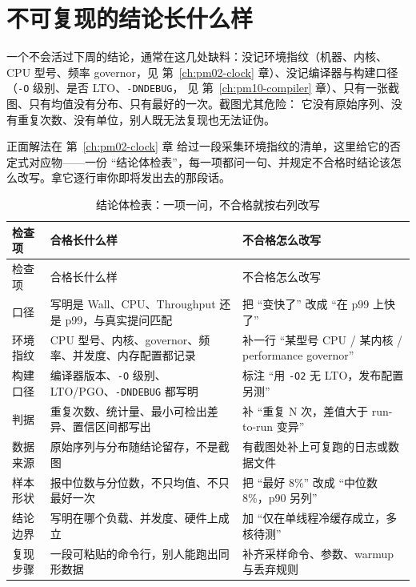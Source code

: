 \documentclass[12pt,a4paper,fontset=fandol]{ctexbook}
\newcommand{\Tp}[1]{\texttt{#1}}
\newcommand{\Lang}[1]{\textsf{#1}}
\newcommand{\MWall}{\Lang{Wall}}
\newcommand{\MCpu}{\Lang{CPU}}
\newcommand{\MThr}{\Lang{Throughput}}
\newcommand{\Mx}[1]{\textsf{#1}}
\begin{document}
\section{不可复现的结论长什么样}
\label{sec:pm15-antipattern-unrepro}

一个不会活过下周的结论，通常在这几处缺料：没记环境指纹（机器、内核、CPU 型号、频率 governor，见
第~\ref{ch:pm02-clock} 章）、没记编译器与构建口径（\Tp{-O} 级别、是否 LTO、\Tp{-DNDEBUG}，
见 第~\ref{ch:pm10-compiler} 章）、只有一张截图、只有均值没有分布、只有最好的一次。截图尤其危险：
它没有原始序列、没有重复次数、没有单位，别人既无法复现也无法证伪。

正面解法在 第~\ref{ch:pm02-clock} 章 给过一段采集环境指纹的清单，这里给它的否定式对应物——一份
``结论体检表''，每一项都问一句、并规定不合格时结论该怎么改写。拿它逐行审你即将发出去的那段话。

\begin{longtable}{@{}>{\raggedright\arraybackslash}p{}>{\raggedright\arraybackslash}p{}>{\raggedright\arraybackslash}p{}@{}}
\caption{结论体检表：一项一问，不合格就按右列改写}\label{tab:pm15-audit}\\
\toprule
检查项 & 合格长什么样 & 不合格怎么改写 \\
\midrule
\endfirsthead
\toprule
检查项 & 合格长什么样 & 不合格怎么改写 \\
\midrule
\endhead
\bottomrule
\endfoot
口径 & 写明是 \MWall{}、\MCpu{}、\MThr{} 还是 \Mx{p99}，与真实提问匹配 & 把 ``变快了'' 改成 ``在 \Mx{p99} 上快了'' \\
环境指纹 & CPU 型号、内核、governor、频率、并发度、内存配置都记录 & 补一行 ``某型号 CPU / 某内核 / performance governor'' \\
构建口径 & 编译器版本、\Tp{-O} 级别、LTO/PGO、\Tp{-DNDEBUG} 都写明 & 标注 ``用 \Tp{-O2} 无 LTO，发布配置另测'' \\
判据 & 重复次数、统计量、最小可检出差异、置信区间都写出 & 补 ``重复 N 次，差值大于 run-to-run 变异'' \\
数据来源 & 原始序列与分布随结论留存，不是截图 & 有截图处补上可复跑的日志或数据文件 \\
样本形状 & 报中位数与分位数，不只均值、不只最好一次 & 把 ``最好 8\%'' 改成 ``中位数 8\%，p90 另列'' \\
结论边界 & 写明在哪个负载、并发度、硬件上成立 & 加 ``仅在单线程冷缓存成立，多核待测'' \\
复现步骤 & 一段可粘贴的命令行，别人能跑出同形数据 & 补齐采样命令、参数、warmup 与丢弃规则 \\
\end{longtable}
\end{document}
